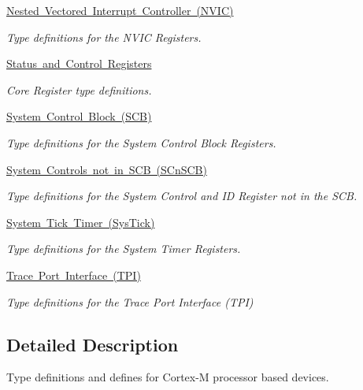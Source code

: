 \begin{DoxyCompactItemize}
\mbox{\hyperlink{group__CMSIS__NVIC}{Nested Vectored Interrupt Controller (\+N\+V\+I\+C)}}
\begin{DoxyCompactList}\small\item\em Type definitions for the N\+V\+IC Registers. \end{DoxyCompactList}\item 
\mbox{\hyperlink{group__CMSIS__CORE}{Status and Control Registers}}
\begin{DoxyCompactList}\small\item\em Core Register type definitions. \end{DoxyCompactList}\item 
\mbox{\hyperlink{group__CMSIS__SCB}{System Control Block (\+S\+C\+B)}}
\begin{DoxyCompactList}\small\item\em Type definitions for the System Control Block Registers. \end{DoxyCompactList}\item 
\mbox{\hyperlink{group__CMSIS__SCnSCB}{System Controls not in S\+C\+B (\+S\+Cn\+S\+C\+B)}}
\begin{DoxyCompactList}\small\item\em Type definitions for the System Control and ID Register not in the S\+CB. \end{DoxyCompactList}\item 
\mbox{\hyperlink{group__CMSIS__SysTick}{System Tick Timer (\+Sys\+Tick)}}
\begin{DoxyCompactList}\small\item\em Type definitions for the System Timer Registers. \end{DoxyCompactList}\item 
\mbox{\hyperlink{group__CMSIS__TPI}{Trace Port Interface (\+T\+P\+I)}}
\begin{DoxyCompactList}\small\item\em Type definitions for the Trace Port Interface (T\+PI) \end{DoxyCompactList}\end{DoxyCompactItemize}


\subsection{Detailed Description}
Type definitions and defines for Cortex-\/M processor based devices. 

